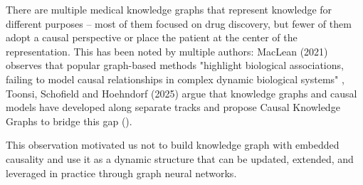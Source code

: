There are multiple medical knowledge graphs that represent knowledge for different
purposes -- most of them focused on drug discovery, but fewer of them
adopt a causal perspective or place the patient at the center of the
representation. This has been noted by multiple authors: MacLean (2021)
observes that popular graph-based methods "highlight biological
associations, failing to model causal relationships in complex dynamic
biological systems" \cite{maclean2021knowledge}, Toonsi, Schofield and
Hoehndorf (2025) argue that knowledge graphs and causal models have
developed along separate tracks and propose Causal Knowledge Graphs to
bridge this gap (\cite{toonsi2025causal}).


This observation motivated us not to build knowledge graph with embedded causality 
and use it as a dynamic 
structure that can be updated, extended, and leveraged in practice
through graph neural networks.


